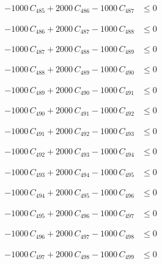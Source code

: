 \documentclass[a4paper,11pt]{article}
\begin{document}
\begin{align}
-1000\,C_{485} + 2000\,C_{486} - 1000\,C_{487} &\leq 0 \nonumber
\end{align}

\begin{align}
-1000\,C_{486} + 2000\,C_{487} - 1000\,C_{488} &\leq 0 \nonumber
\end{align}

\begin{align}
-1000\,C_{487} + 2000\,C_{488} - 1000\,C_{489} &\leq 0 \nonumber
\end{align}

\begin{align}
-1000\,C_{488} + 2000\,C_{489} - 1000\,C_{490} &\leq 0 \nonumber
\end{align}

\begin{align}
-1000\,C_{489} + 2000\,C_{490} - 1000\,C_{491} &\leq 0 \nonumber
\end{align}

\begin{align}
-1000\,C_{490} + 2000\,C_{491} - 1000\,C_{492} &\leq 0 \nonumber
\end{align}

\begin{align}
-1000\,C_{491} + 2000\,C_{492} - 1000\,C_{493} &\leq 0 \nonumber
\end{align}

\begin{align}
-1000\,C_{492} + 2000\,C_{493} - 1000\,C_{494} &\leq 0 \nonumber
\end{align}

\begin{align}
-1000\,C_{493} + 2000\,C_{494} - 1000\,C_{495} &\leq 0 \nonumber
\end{align}

\begin{align}
-1000\,C_{494} + 2000\,C_{495} - 1000\,C_{496} &\leq 0 \nonumber
\end{align}

\begin{align}
-1000\,C_{495} + 2000\,C_{496} - 1000\,C_{497} &\leq 0 \nonumber
\end{align}

\begin{align}
-1000\,C_{496} + 2000\,C_{497} - 1000\,C_{498} &\leq 0 \nonumber
\end{align}

\begin{align}
-1000\,C_{497} + 2000\,C_{498} - 1000\,C_{499} &\leq 0 \nonumber
\end{align}
\end{document}
